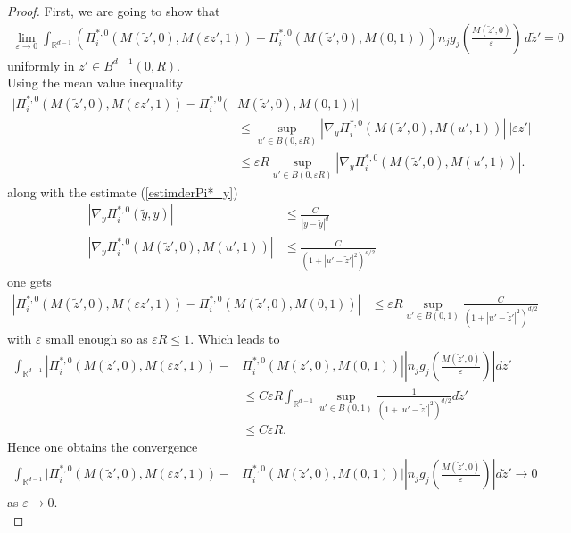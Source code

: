 \documentclass[11pt, reqno]{amsart}
\theoremstyle{definition}
\theoremstyle{remark}
\numberwithin{equation}{section}
\begin{document}
\begin{proof}[Proof]
		
		\noindent First, we are going to show that 
		\begin{align*}
			\lim_{\varepsilon\rightarrow 0} \int_{\mathbb{R}^{d-1}} \left( \Pi^{*,0}_i\left(M(\tilde{z}',0),M (\varepsilon z',1) \right) -  \Pi^{*,0}_i\left(M(\tilde{z}',0),M (0,1) \right)\right )  n_j g_j\left(\frac{M(\tilde{z}',0)}{\varepsilon }\right)\,d\tilde{z}' =0
		\end{align*} uniformly in $z'\in B^{d-1}(0,R).$\\
		
		\noindent Using the mean value inequality  
		\begin{align*}
			| \Pi^{*,0}_i\left(M(\tilde{z}',0),M (\varepsilon z',1) \right) -  \Pi^{*,0}_i(&M(\tilde{z}',0),M (0,1) ) |\\ &\leq \sup_{u'\in B(0,\varepsilon R)} | \nabla_y \Pi^{*,0}_i\left(M(\tilde{z}',0),M (u',1) \right)\!|\ |\varepsilon z'|\\
			&\leq \varepsilon R \sup_{u'\in B(0,\varepsilon R)} |\nabla_y  \Pi^{*,0}_i(M(\tilde{z}',0),M (u',1) )|.
		\end{align*}
		along with the  estimate (\ref{estimderPi*_y}) 
		\begin{align*}
			|  \nabla_y  \Pi^{*,0}_i(\tilde{y},y ) | &\leq\frac{C}{|y-\tilde{y}|^{d}}\\
			|\nabla_y  \Pi^{*,0}_i(M(\tilde{z}',0),M (u',1) )|
			&\leq \frac{C}{(1+|u'-\tilde{z}'|^2)^{d/2}}
		\end{align*}
		one gets
		\begin{align*}
			| \Pi^{*,0}_i\left(M(\tilde{z}',0),M (\varepsilon z',1) \right) -  \Pi^{*,0}_i(M(\tilde{z}',0),M (0,1) ) |
			&\leq \varepsilon R \sup_{u'\in B(0,1)}\frac{C}{(1+|u'-\tilde{z}'|^2)^{d/2}}
		\end{align*}
		with $\varepsilon$ small enough so as $\varepsilon R\leq 1$. Which leads to
		\begin{align*}
			\int_{{\mathbb{R}}^{d-1}}	\left| \Pi^{*,0}_i\left(M(\tilde{z}',0),M (\varepsilon z',1) \right)\right. - &\left. \Pi^{*,0}_i(M(\tilde{z}',0), M (0,1) ) \right|  \left| n_j g_j\left(\frac{M(\tilde{z}',0)}{\varepsilon }\right) \right|  d\tilde{z}'\\
			&\leq C\varepsilon R \int_{{\mathbb{R}}^{d-1}}\sup_{u'\in B(0,1)}\frac{1}{(1+|u'-\tilde{z}'|^2)^{d/2}}d\tilde{z}'\\
			&\leq C\varepsilon R. 
		\end{align*}
		Hence one obtains the convergence
		\begin{align}
			\int_{{\mathbb{R}}^{d-1}}	| \Pi^{*,0}_i\left(M(\tilde{z}',0),M (\varepsilon z',1) \right) - & \Pi^{*,0}_i(M(\tilde{z}',0), M (0,1) ) |  \left| n_j g_j\left(\frac{M(\tilde{z}',0)}{\varepsilon }\right) \right|  d\tilde{z}'\rightarrow 0
		\end{align}
		as $\varepsilon \rightarrow 0.$\\
		

\end{proof}
\end{document}
